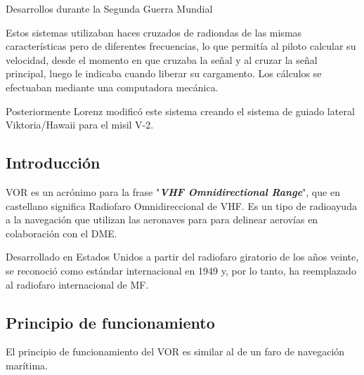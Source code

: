 \begin{myboxRojo}{Desarrollos durante la Segunda Guerra Mundial}
{Estos sistemas utilizaban haces cruzados de radiondas de las mismas caracter\'isticas pero de diferentes frecuencias, lo que permit\'ia al piloto calcular su velocidad, desde el momento en que cruzaba la se\~nal y al cruzar la señal principal, luego le indicaba cuando liberar su cargamento.
Los c\'alculos se efectuaban mediante una computadora mec\'anica.

Posteriormente Lorenz modific\'o este sistema creando el sistema de guiado lateral 
Viktoria/Hawaii 
para el misil V-2.

}

\end{myboxRojo}


\subsection{Introducci\'on}
\label{sec:introduccion.vor}

VOR es un acr\'onimo para la frase "\textbf{\textit{VHF Omnidirectional Range}}", que en castellano significa Radiofaro Omnidireccional de VHF. Es un tipo de radioayuda a la navegaci\'on que utilizan las aeronaves para  para delinear aerovías en colaboración con el DME.

Desarrollado en Estados Unidos a partir del radiofaro giratorio de los años veinte, se reconoció como estándar internacional en 1949 y, por lo tanto, ha reemplazado al radiofaro internacional de MF.


\subsection{Principio de funcionamiento}
\label{Principio de funcionamiento}

El principio de funcionamiento del VOR es similar al de un faro de navegaci\'on mar\'itima.

